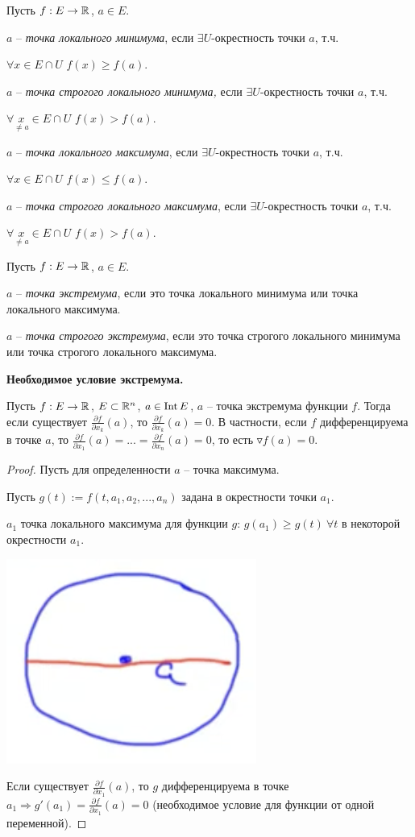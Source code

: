 \begin{definition}
    Пусть $f: E\rightarrow \mathbb{R}$, $a\in E$. 
    
    $a$ – \textit{точка локального минимума}, если $\exists U$-окрестность точки $a$, т.ч. 
    
    $\forall x\in E\cap U$ $f(x)\geq f(a)$.

    $a$ – \textit{точка строгого локального минимума,} если $\exists U$-окрестность точки $a$, т.ч.
    
    $\forall \underset{\neq a}{x}\in E\cap U$ $f(x)> f(a)$.

    $a$ – \textit{точка локального максимума}, если $\exists U$-окрестность точки $a$, т.ч.
    
    $\forall x\in E\cap U$ $f(x)\leq f(a)$.

    $a$ – \textit{точка строгого локального максимума}, если $\exists U$-окрестность точки $a$, т.ч.
    
    $\forall \underset{\neq a}{x}\in E\cap U$ $f(x)> f(a)$.
\end{definition}

\begin{definition}
    Пусть $f: E\rightarrow \mathbb{R}$, $a\in E$. 

    $a$ – \textit{точка экстремума}, если это точка локального минимума или точка локального максимума.

    $a$ – \textit{точка строгого экстремума}, если это точка строгого локального минимума или точка строгого локального максимума.
\end{definition}

\begin{theorem}
    \textbf{Необходимое условие экстремума.}

    Пусть $f: E\rightarrow \mathbb{R}$, $E\subset \mathbb{R}^n$, $a\in \operatorname{Int} E$, $a$ – точка экстремума функции $f$. Тогда если существует $\frac{\partial f}{\partial x_k}(a)$, то $\frac{\partial f}{\partial x_k}(a)=0$. В частности, если $f$ дифференцируема в точке $a$, то $\frac{\partial f}{\partial x_1}(a)=...=\frac{\partial f}{\partial x_n}(a)=0$, то есть $\triangledown f(a)=0$.
\end{theorem}

\begin{proof}

    Пусть для определенности $a$ – точка максимума.

    Пусть $g(t) := f(t, a_1, a_2, ..., a_n)$ задана в окрестности точки $a_1$.

    $a_1$ точка локального максимума для функции $g$: $g(a_1)\geq g(t)\ \forall t$ в некоторой окрестности $a_1$.

    \includegraphics[width=0.1\linewidth]{images/07-06-2.png}

    Если существует $\frac{\partial f}{\partial x_1}(a)$, то $g$ дифференцируема в точке $a_1\Rightarrow g'(a_1)=\frac{\partial f}{\partial x_1}(a)=0$ (необходимое условие для функции от одной переменной).
\end{proof}

